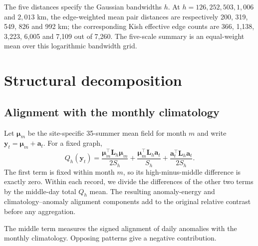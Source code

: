 \documentclass[namedate,webpdf,modern,mediumone]{oup-authoring-template}
\theoremstyle{thmstyleone}
\begin{document}
The five distances specify the Gaussian bandwidths $h$. At $h=126,252,503,1{,}006$ and $2{,}013$ km, the
edge-weighted mean pair distances are respectively 200, 319, 549, 826 and
992 km; the corresponding Kish effective edge counts are 366, 1,138, 3,223,
6,005 and 7,109 out of 7,260. The five-scale summary is an equal-weight mean
over this logarithmic bandwidth grid.

\section{Structural decomposition}
\label{sec:structural-checks}

\subsection{Alignment with the monthly climatology}

Let $\boldsymbol\mu_m$ be the site-specific 35-summer mean field for month
$m$ and write $\mathbf y_t=\boldsymbol\mu_m+\mathbf a_t$. For a fixed graph,
\begin{equation}
 Q_h(\mathbf y_t)=
 \frac{\boldsymbol\mu_m^\top\mathbf L_h\boldsymbol\mu_m}{2S_h}
 +\frac{\boldsymbol\mu_m^\top\mathbf L_h\mathbf a_t}{S_h}
 +\frac{\mathbf a_t^\top\mathbf L_h\mathbf a_t}{2S_h}.
 \label{eq:s-energy-decomposition}
\end{equation}
The first term is fixed within month $m$, so its high-minus-middle difference
is exactly zero. Within each record, we divide the differences of the other
two terms by the middle-day total $Q_h$ mean. The resulting anomaly-energy and
climatology--anomaly alignment components add to the original relative
contrast before any aggregation.

The middle term measures the signed alignment of daily anomalies with the
monthly climatology. Opposing patterns give a negative contribution.
\end{document}
